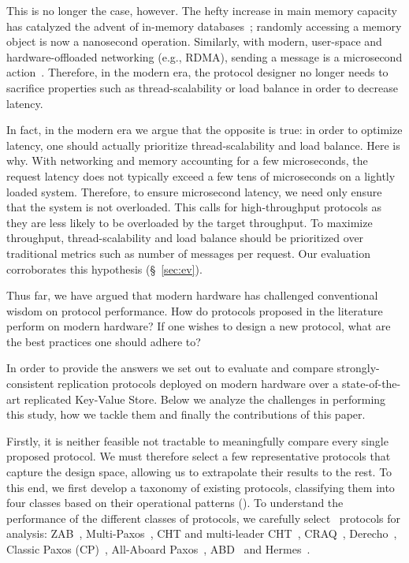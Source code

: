 This is no longer the case, however. 
The hefty increase in main memory capacity has catalyzed the advent of in-memory databases~\cite{Lim:2014, Li:2016}; randomly accessing a memory object is now a nanosecond operation.
Similarly, with modern, user-space and hardware-offloaded networking (e.g., RDMA), sending a message is a microsecond action~\cite{Dragojevic:2014}.
Therefore, in the modern era, the protocol designer no longer needs to sacrifice properties such as thread-scalability or load balance in order to decrease latency. 

In fact, in the modern era we argue that the opposite is true: in order to optimize latency, one should actually prioritize thread-scalability and load balance.
Here is why. With networking and memory accounting for a few microseconds, the request latency does not typically exceed a few tens of microseconds on a lightly loaded system. 
Therefore, to ensure microsecond latency, we need only ensure that the system is not overloaded.
This calls for high-throughput protocols as they are less likely to be overloaded by the target throughput. 
To maximize throughput,  thread-scalability and load balance should be prioritized over traditional metrics such as number of messages per request.
Our evaluation corroborates this hypothesis (\S~\ref{sec:ev}).

Thus far, we have argued that modern hardware has challenged conventional wisdom on protocol performance. How do protocols proposed in the literature perform on modern hardware? If one wishes to design a new protocol, what are the best practices one should adhere to? 

In order to provide the answers we set out to evaluate and compare strongly-consistent replication protocols deployed on modern hardware 
over a state-of-the-art replicated Key-Value Store.
Below we analyze the challenges in performing this study, how we tackle them and finally the contributions of this paper.

Firstly, it is neither feasible not tractable to meaningfully compare every single proposed protocol.
We must therefore select a few representative protocols that capture the design space, allowing us to extrapolate their results to the rest. 
To this end, we first develop a taxonomy of existing protocols, classifying them into four classes based on their operational patterns ().
To understand the performance of the different classes of protocols, we carefully select \pnum~protocols for analysis:
ZAB~\cite{Hunt:2010},  
Multi-Paxos~\cite{Lamport:2001}, 
CHT and multi-leader CHT~\cite{Chandra:2016}, 
CRAQ~\cite{Terrace:2009}, 
Derecho~\cite{Jha:2019}, 
Classic Paxos (CP)~\cite{Lamport:1998}, 
All-Aboard Paxos~\cite{Howard:2019}, 
ABD~\cite{Lynch:1997} and 
Hermes~\cite{A:2020}. 



